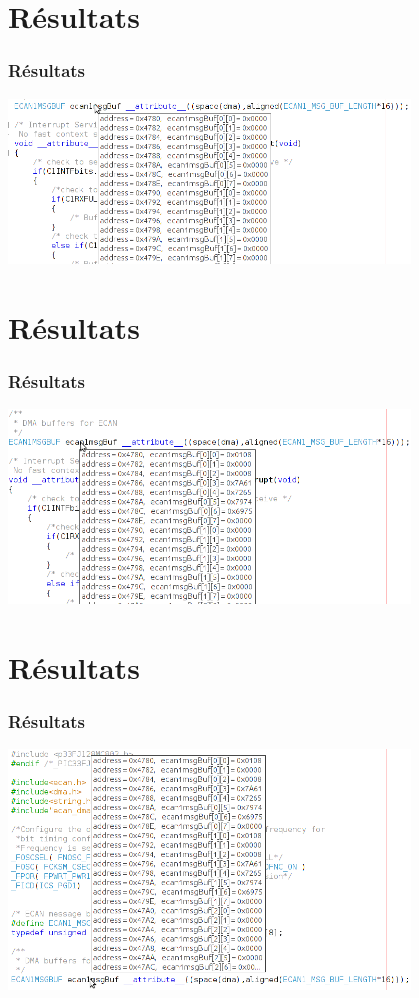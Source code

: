\documentclass{beamer}
\begin{document}
\section{Résultats}
\begin{frame}
\frametitle{Résultats}
\includegraphics[width=0.8\textwidth]{images/CAN_avant_envoi.png}
\end{frame}
\section{Résultats}
\begin{frame}
\frametitle{Résultats}
\includegraphics[width=0.8\textwidth]{images/CAN_avant_reception.png}
\end{frame}
\section{Résultats}
\begin{frame}
\frametitle{Résultats}
\includegraphics[width=0.8\textwidth]{images/CAN_apres_reception.png}
\end{frame}
\end{document}
